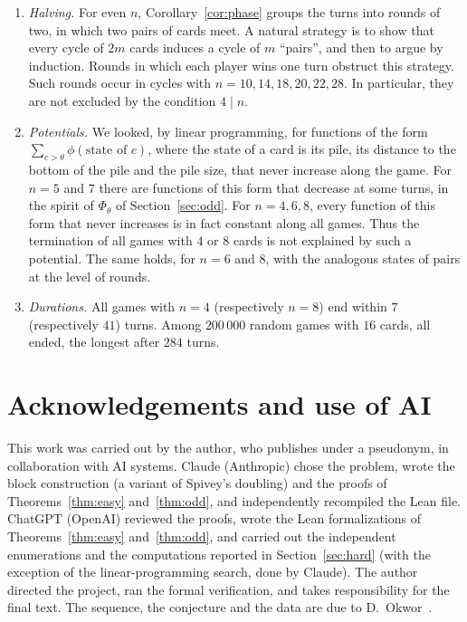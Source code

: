 \documentclass[11pt,a4paper]{amsart}
\theoremstyle{definition}
\theoremstyle{remark}
\begin{document}
\begin{enumerate}[leftmargin=2em]
\item \emph{Halving.} For even $n$, Corollary~\ref{cor:phase} groups the turns into rounds of two, in which two pairs of cards meet. A natural strategy is to show that every cycle of $2m$ cards induces a cycle of $m$ ``pairs'', and then to argue by induction. Rounds in which each player wins one turn obstruct this strategy. Such rounds occur in cycles with $n=10,14,18,20,22,28$. In particular, they are not excluded by the condition $4\mid n$.
\item \emph{Potentials.} We looked, by linear programming, for functions of the form $\sum_{c>\theta}\phi(\text{state of }c)$, where the state of a card is its pile, its distance to the bottom of the pile and the pile size, that never increase along the game. For $n=5$ and $7$ there are functions of this form that decrease at some turns, in the spirit of $\Phi_\theta$ of Section~\ref{sec:odd}. For $n=4,6,8$, every function of this form that never increases is in fact constant along all games. Thus the termination of all games with $4$ or $8$ cards is not explained by such a potential. The same holds, for $n=6$ and $8$, with the analogous states of pairs at the level of rounds.
\item \emph{Durations.} All games with $n=4$ (respectively $n=8$) end within $7$ (respectively $41$) turns. Among $200\,000$ random games with $16$ cards, all ended, the longest after $284$ turns.
\end{enumerate}

\section*{Acknowledgements and use of AI}

This work was carried out by the author, who publishes under a pseudonym, in collaboration with AI systems. Claude (Anthropic) chose the problem, wrote the block construction (a variant of Spivey's doubling) and the proofs of Theorems~\ref{thm:easy} and~\ref{thm:odd}, and independently recompiled the Lean file. ChatGPT (OpenAI) reviewed the proofs, wrote the Lean formalizations of Theorems~\ref{thm:easy} and~\ref{thm:odd}, and carried out the independent enumerations and the computations reported in Section~\ref{sec:hard} (with the exception of the linear-programming search, done by Claude). The author directed the project, ran the formal verification, and takes responsibility for the final text. The sequence, the conjecture and the data are due to D.~Okwor~\cite{Okwor}.
\end{document}
